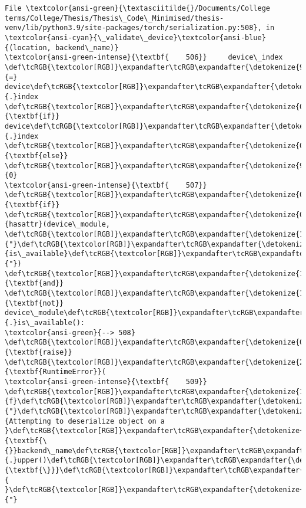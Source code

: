 \documentclass[11pt]{article}
\begin{document}
\begin{Verbatim}[commandchars=\\\{\}, frame=single, framerule=2mm, rulecolor=\color{outerrorbackground}]
File \textcolor{ansi-green}{\textasciitilde{}/Documents/College terms/College/Thesis/Thesis\_Code\_Minimised/thesis-venv/lib/python3.9/site-packages/torch/serialization.py:508}, in \textcolor{ansi-cyan}{\_validate\_device}\textcolor{ansi-blue}{(location, backend\_name)}
\textcolor{ansi-green-intense}{\textbf{    506}}     device\_index \def\tcRGB{\textcolor[RGB]}\expandafter\tcRGB\expandafter{\detokenize{98,98,98}}{=} device\def\tcRGB{\textcolor[RGB]}\expandafter\tcRGB\expandafter{\detokenize{98,98,98}}{.}index \def\tcRGB{\textcolor[RGB]}\expandafter\tcRGB\expandafter{\detokenize{0,135,0}}{\textbf{if}} device\def\tcRGB{\textcolor[RGB]}\expandafter\tcRGB\expandafter{\detokenize{98,98,98}}{.}index \def\tcRGB{\textcolor[RGB]}\expandafter\tcRGB\expandafter{\detokenize{0,135,0}}{\textbf{else}} \def\tcRGB{\textcolor[RGB]}\expandafter\tcRGB\expandafter{\detokenize{98,98,98}}{0}
\textcolor{ansi-green-intense}{\textbf{    507}} \def\tcRGB{\textcolor[RGB]}\expandafter\tcRGB\expandafter{\detokenize{0,135,0}}{\textbf{if}} \def\tcRGB{\textcolor[RGB]}\expandafter\tcRGB\expandafter{\detokenize{0,135,0}}{hasattr}(device\_module, \def\tcRGB{\textcolor[RGB]}\expandafter\tcRGB\expandafter{\detokenize{175,0,0}}{"}\def\tcRGB{\textcolor[RGB]}\expandafter\tcRGB\expandafter{\detokenize{175,0,0}}{is\_available}\def\tcRGB{\textcolor[RGB]}\expandafter\tcRGB\expandafter{\detokenize{175,0,0}}{"}) \def\tcRGB{\textcolor[RGB]}\expandafter\tcRGB\expandafter{\detokenize{175,0,255}}{\textbf{and}} \def\tcRGB{\textcolor[RGB]}\expandafter\tcRGB\expandafter{\detokenize{175,0,255}}{\textbf{not}} device\_module\def\tcRGB{\textcolor[RGB]}\expandafter\tcRGB\expandafter{\detokenize{98,98,98}}{.}is\_available():
\textcolor{ansi-green}{--> 508}     \def\tcRGB{\textcolor[RGB]}\expandafter\tcRGB\expandafter{\detokenize{0,135,0}}{\textbf{raise}} \def\tcRGB{\textcolor[RGB]}\expandafter\tcRGB\expandafter{\detokenize{215,95,95}}{\textbf{RuntimeError}}(
\textcolor{ansi-green-intense}{\textbf{    509}}         \def\tcRGB{\textcolor[RGB]}\expandafter\tcRGB\expandafter{\detokenize{175,0,0}}{f}\def\tcRGB{\textcolor[RGB]}\expandafter\tcRGB\expandafter{\detokenize{175,0,0}}{"}\def\tcRGB{\textcolor[RGB]}\expandafter\tcRGB\expandafter{\detokenize{175,0,0}}{Attempting to deserialize object on a }\def\tcRGB{\textcolor[RGB]}\expandafter\tcRGB\expandafter{\detokenize{175,95,135}}{\textbf{\{}}backend\_name\def\tcRGB{\textcolor[RGB]}\expandafter\tcRGB\expandafter{\detokenize{98,98,98}}{.}upper()\def\tcRGB{\textcolor[RGB]}\expandafter\tcRGB\expandafter{\detokenize{175,95,135}}{\textbf{\}}}\def\tcRGB{\textcolor[RGB]}\expandafter\tcRGB\expandafter{\detokenize{175,0,0}}{ }\def\tcRGB{\textcolor[RGB]}\expandafter\tcRGB\expandafter{\detokenize{175,0,0}}{"}

\end{Verbatim}
\end{document}
